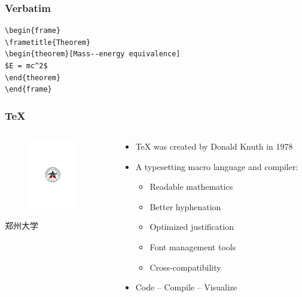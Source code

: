 \documentclass[aspectratio=169]{beamer}
\begin{document}
\begin{frame}[fragile] %
\frametitle{Verbatim}
\begin{example}
\begin{verbatim}
\begin{frame}
\frametitle{Theorem}
\begin{theorem}[Mass--energy equivalence]
$E = mc^2$
\end{theorem}
\end{frame}\end{verbatim}
\end{example}
\end{frame}


\begin{frame}
\frametitle{\TeX{}}
\begin{columns}
\begin{column}{4cm}
	\begin{figure}
		\includegraphics[height=3cm]{images/ZZU_badge.pdf}
	\end{figure}
	\begin{center}
		\tiny
		郑州大学 \\
	\end{center}
\end{column}
\begin{column}{6cm}
	\begin{itemize}
		\item \TeX{} was created by Donald Knuth in 1978
		\item A typesetting macro language and compiler:
		\begin{itemize}
			\item Readable mathematics
			\item Better hyphenation
			\item Optimized justification
			\item Font management tools
			\item Cross-compatibility
		\end{itemize}
		\item Code -- Compile -- Visualize
	\end{itemize}
\end{column}
\end{columns}
\end{frame}
\end{document}
